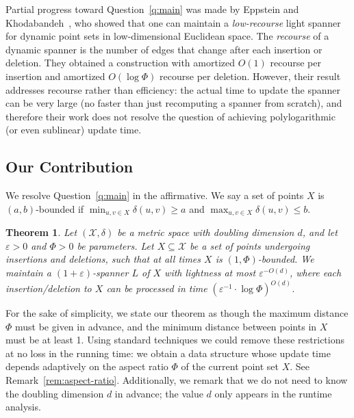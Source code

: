 \documentclass[11pt]{article}
\let\e\varepsilon               %
\def\EMPH#1{\emph{\textcolor{BrickRed} {#1}}}
\newtheorem{theorem}{Theorem}[section]
\newcommand{\cX}{\mathcal{X}}
\newcommand{\dist}{\ensuremath{\delta}}
\newcommand{\ddim}{\ensuremath{d}}
\begin{document}
%
%
Partial progress toward Question~\ref{q:main} was made by Eppstein and Khodabandeh~\cite{EK24}, who showed that one can maintain a \EMPH{low-recourse} light spanner for dynamic point sets in low-dimensional Euclidean space. The \emph{recourse} of a dynamic spanner is the number of edges that change after each insertion or deletion. They obtained a construction with amortized $O(1)$ recourse per insertion and amortized $O(\log \Phi)$ recourse per deletion. However, their result addresses recourse rather than efficiency: the actual time to update the spanner can be very large (no faster than just recomputing a spanner from scratch), and therefore their work does not resolve the question of achieving polylogarithmic (or even sublinear) update time.
%
%
%
%
%
\subsection{Our Contribution}
%
We resolve Question~\ref{q:main} in the affirmative. We say a set of points $X$ is $(a,b)$-bounded if $\min_{u,v \in X} \dist(u,v) \ge a$ and $\max_{u,v \in X} \dist(u,v) \le b$.

\begin{theorem}
\label{thm:main}
    Let $(\cX, \dist)$ be a metric space with doubling dimension $\ddim$, and let $\e >0$ and $\Phi > 0$ be parameters. Let $X \subseteq \cX$ be a set of points undergoing insertions and deletions, such that at all times $X$ is $(1, \Phi)$-bounded. We maintain a $(1+\e)$-spanner $L$ of $X$ with lightness at most $\e^{-O(\ddim)}$, where each insertion/deletion to $X$ can be processed in time $(\e^{-1} \cdot \log \Phi)^{O(\ddim)}$.
\end{theorem}

For the sake of simplicity, we state our theorem as though the maximum distance $\Phi$ must be given in advance, and the minimum distance between points in $X$ must be at least 1. Using standard techniques \cite{KL04,EK24} we could remove these restrictions at no loss in the running time: we obtain a data structure whose update time depends adaptively on the aspect ratio $\Phi$ of the current point set $X$. See Remark~\ref{rem:aspect-ratio}. 
Additionally, we remark that we do not need to know the doubling dimension $\ddim$ in advance; the value $\ddim$ only appears in the runtime analysis.
%
\end{document}
